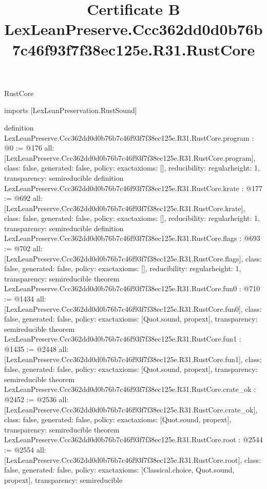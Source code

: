 \begin{lexlean}{RustCore}
\title{Certificate B LexLeanPreserve.Ccc362dd0d0b76b7c46f93f7f38ec125e.R31.RustCore}
\begin{coremodule}
imports [LexLeanPreservation.RustSound]

definition LexLeanPreserve.Ccc362dd0d0b76b7c46f93f7f38ec125e.R31.RustCore.program : @0 := @176 {
  all: [LexLeanPreserve.Ccc362dd0d0b76b7c46f93f7f38ec125e.R31.RustCore.program],
  class: false,
  generated: false,
  policy: exact{axioms: []},
  reducibility: regular{height: 1},
  transparency: semireducible
}
definition LexLeanPreserve.Ccc362dd0d0b76b7c46f93f7f38ec125e.R31.RustCore.krate : @177 := @692 {
  all: [LexLeanPreserve.Ccc362dd0d0b76b7c46f93f7f38ec125e.R31.RustCore.krate],
  class: false,
  generated: false,
  policy: exact{axioms: []},
  reducibility: regular{height: 1},
  transparency: semireducible
}
definition LexLeanPreserve.Ccc362dd0d0b76b7c46f93f7f38ec125e.R31.RustCore.flags : @693 := @702 {
  all: [LexLeanPreserve.Ccc362dd0d0b76b7c46f93f7f38ec125e.R31.RustCore.flags],
  class: false,
  generated: false,
  policy: exact{axioms: []},
  reducibility: regular{height: 1},
  transparency: semireducible
}
theorem LexLeanPreserve.Ccc362dd0d0b76b7c46f93f7f38ec125e.R31.RustCore.fun0 : @710 := @1434 {
  all: [LexLeanPreserve.Ccc362dd0d0b76b7c46f93f7f38ec125e.R31.RustCore.fun0],
  class: false,
  generated: false,
  policy: exact{axioms: [Quot.sound, propext]},
  transparency: semireducible
}
theorem LexLeanPreserve.Ccc362dd0d0b76b7c46f93f7f38ec125e.R31.RustCore.fun1 : @1435 := @2448 {
  all: [LexLeanPreserve.Ccc362dd0d0b76b7c46f93f7f38ec125e.R31.RustCore.fun1],
  class: false,
  generated: false,
  policy: exact{axioms: [Quot.sound, propext]},
  transparency: semireducible
}
theorem LexLeanPreserve.Ccc362dd0d0b76b7c46f93f7f38ec125e.R31.RustCore.crate_ok : @2452 := @2536 {
  all: [LexLeanPreserve.Ccc362dd0d0b76b7c46f93f7f38ec125e.R31.RustCore.crate_ok],
  class: false,
  generated: false,
  policy: exact{axioms: [Quot.sound, propext]},
  transparency: semireducible
}
theorem LexLeanPreserve.Ccc362dd0d0b76b7c46f93f7f38ec125e.R31.RustCore.root : @2544 := @2554 {
  all: [LexLeanPreserve.Ccc362dd0d0b76b7c46f93f7f38ec125e.R31.RustCore.root],
  class: false,
  generated: false,
  policy: exact{axioms: [Classical.choice, Quot.sound, propext]},
  transparency: semireducible
}


\end{coremodule}
\end{lexlean}
